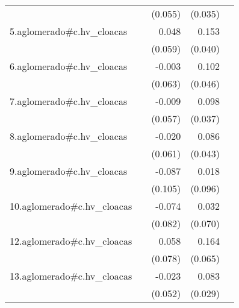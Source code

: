 {\begin{longtable}{l*{4}{D{.}{.}{-1}}}
            &                     &     (0.055)         &     (0.035)         &                     \\
\addlinespace
5.aglomerado#c.hv\_cloacas&                     &       0.048         &       0.153\sym{***}&                     \\
            &                     &     (0.059)         &     (0.040)         &                     \\
\addlinespace
6.aglomerado#c.hv\_cloacas&                     &      -0.003         &       0.102\sym{*}  &                     \\
            &                     &     (0.063)         &     (0.046)         &                     \\
\addlinespace
7.aglomerado#c.hv\_cloacas&                     &      -0.009         &       0.098\sym{**} &                     \\
            &                     &     (0.057)         &     (0.037)         &                     \\
\addlinespace
8.aglomerado#c.hv\_cloacas&                     &      -0.020         &       0.086\sym{*}  &                     \\
            &                     &     (0.061)         &     (0.043)         &                     \\
\addlinespace
9.aglomerado#c.hv\_cloacas&                     &      -0.087         &       0.018         &                     \\
            &                     &     (0.105)         &     (0.096)         &                     \\
\addlinespace
10.aglomerado#c.hv\_cloacas&                     &      -0.074         &       0.032         &                     \\
            &                     &     (0.082)         &     (0.070)         &                     \\
\addlinespace
12.aglomerado#c.hv\_cloacas&                     &       0.058         &       0.164\sym{*}  &                     \\
            &                     &     (0.078)         &     (0.065)         &                     \\
\addlinespace
13.aglomerado#c.hv\_cloacas&                     &      -0.023         &       0.083\sym{**} &                     \\
            &                     &     (0.052)         &     (0.029)         &                     \\

\end{longtable}}

